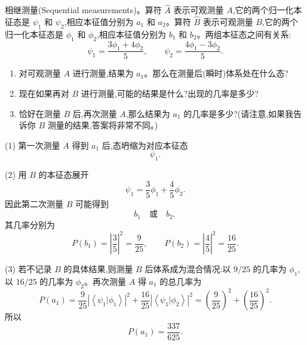 \begin{question}
相继测量(Sequential measurements)。算符 $\hat A$ 表示可观测量 $A$,它的两个归一化本征态是 $\psi_1$ 和 $\psi_2$,相应本征值分别为 $a_1$ 和 $a_2$。算符 $\hat B$ 表示可观测量 $B$,它的两个归一化本征态是 $\phi_1$ 和 $\phi_2$,相应本征值分别为 $b_1$ 和 $b_2$。两组本征态之间有关系:
\[
\psi_1=\frac{3\phi_1+4\phi_2}{5},
\qquad
\psi_2=\frac{4\phi_1-3\phi_2}{5}.
\]
\begin{enumerate}
\item 对可观测量 $A$ 进行测量,结果为 $a_1$。那么在测量后(瞬时)体系处在什么态?
\item 现在如果再对 $B$ 进行测量,可能的结果是什么?出现的几率是多少?
\item 恰好在测量 $B$ 后,再次测量 $A$,那么结果为 $a_1$ 的几率是多少?(请注意,如果我告诉你 $B$ 测量的结果,答案将非常不同。)
\end{enumerate}
\end{question}
\begin{solution}
(1) 第一次测量 $A$ 得到 $a_1$ 后,态坍缩为对应本征态
\[
\boxed{\psi_1.}
\]

(2) 用 $B$ 的本征态展开
\[
\psi_1=\frac{3}{5}\phi_1+\frac{4}{5}\phi_2.
\]
因此第二次测量 $B$ 可能得到
\[
b_1\quad\text{或}\quad b_2,
\]
其几率分别为
\[
P(b_1)=\left|\frac35\right|^2=\frac9{25},
\qquad
P(b_2)=\left|\frac45\right|^2=\frac{16}{25}.
\]

(3) 若不记录 $B$ 的具体结果,则测量 $B$ 后体系成为混合情况:以 $9/25$ 的几率为 $\phi_1$,以 $16/25$ 的几率为 $\phi_2$。再次测量 $A$ 得 $a_1$ 的总几率为
\[
P(a_1)=\frac9{25}|\left\langle \psi_1|\phi_1 \right\rangle|^2
+\frac{16}{25}|\left\langle \psi_1|\phi_2 \right\rangle|^2
=\left(\frac9{25}\right)^2+\left(\frac{16}{25}\right)^2.
\]
所以
\[
\boxed{P(a_1)=\frac{337}{625}.}
\]
\end{solution}

